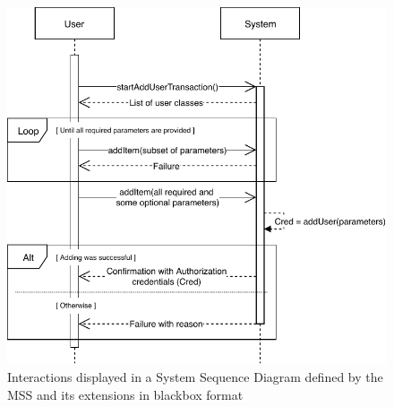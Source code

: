 \begin{figure}[H]
	\centering
	\includegraphics[scale=1]{uml/SD-bb-createuser.pdf}
	\caption*{Interactions displayed in a System Sequence Diagram defined by the MSS and its extensions in blackbox format}
\end{figure}